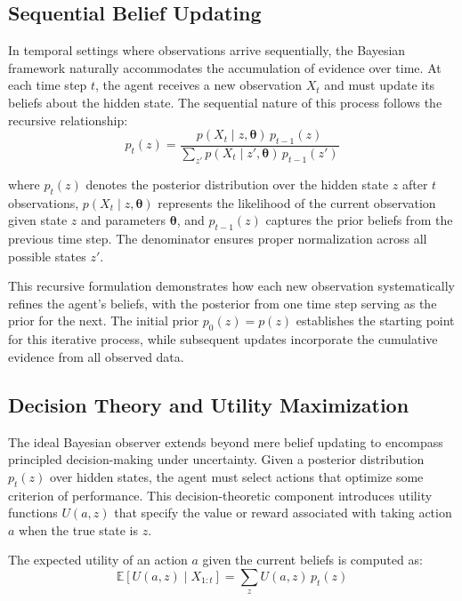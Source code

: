 \documentclass{article}
\begin{document}
\subsection{Sequential Belief Updating}

In temporal settings where observations arrive sequentially, the Bayesian framework naturally accommodates the accumulation of evidence over time. At each time step $t$, the agent receives a new observation $X_t$ and must update its beliefs about the hidden state. The sequential nature of this process follows the recursive relationship:
\begin{equation}
p_t(z) = \frac{p(X_t \mid z, \boldsymbol{\theta}) \, p_{t-1}(z)}{\sum_{z'} p(X_t \mid z', \boldsymbol{\theta}) \, p_{t-1}(z')}
\end{equation}

where $p_t(z)$ denotes the posterior distribution over the hidden state $z$ after $t$ observations, $p(X_t \mid z, \boldsymbol{\theta})$ represents the likelihood of the current observation given state $z$ and parameters $\boldsymbol{\theta}$, and $p_{t-1}(z)$ captures the prior beliefs from the previous time step. The denominator ensures proper normalization across all possible states $z'$.

This recursive formulation demonstrates how each new observation systematically refines the agent's beliefs, with the posterior from one time step serving as the prior for the next. The initial prior $p_0(z) = p(z)$ establishes the starting point for this iterative process, while subsequent updates incorporate the cumulative evidence from all observed data.

\subsection{Decision Theory and Utility Maximization}

The ideal Bayesian observer extends beyond mere belief updating to encompass principled decision-making under uncertainty. Given a posterior distribution $p_t(z)$ over hidden states, the agent must select actions that optimize some criterion of performance. This decision-theoretic component introduces utility functions $U(a, z)$ that specify the value or reward associated with taking action $a$ when the true state is $z$.

The expected utility of an action $a$ given the current beliefs is computed as:
\begin{equation}
\mathbb{E}[U(a, z) \mid X_{1:t}] = \sum_z U(a, z) \, p_t(z)
\end{equation}
\end{document}
